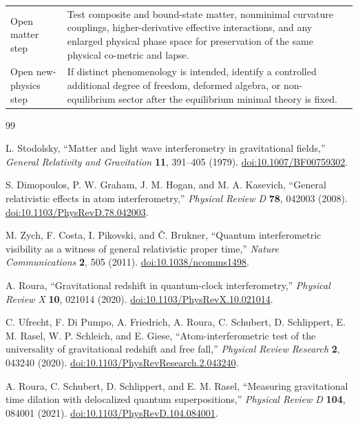 \documentclass[11pt]{article}
\begin{document}
\begin{longtable}{@{}p{}p{}@{}}
Open matter step & Test composite and bound-state matter, nonminimal curvature couplings, higher-derivative effective interactions, and any enlarged physical phase space for preservation of the same physical co-metric and lapse. \\
Open new-physics step & If distinct phenomenology is intended, identify a controlled additional degree of freedom, deformed algebra, or non-equilibrium sector after the equilibrium minimal theory is fixed. \\
\end{longtable}

\begin{thebibliography}{99}

L. Stodolsky,
``Matter and light wave interferometry in gravitational fields,''
\emph{General Relativity and Gravitation} \textbf{11}, 391--405 (1979).
\href{https://doi.org/10.1007/BF00759302}{doi:10.1007/BF00759302}.

S. Dimopoulos, P. W. Graham, J. M. Hogan, and M. A. Kasevich,
``General relativistic effects in atom interferometry,''
\emph{Physical Review D} \textbf{78}, 042003 (2008).
\href{https://doi.org/10.1103/PhysRevD.78.042003}{doi:10.1103/PhysRevD.78.042003}.

M. Zych, F. Costa, I. Pikovski, and \v{C}. Brukner,
``Quantum interferometric visibility as a witness of general relativistic proper time,''
\emph{Nature Communications} \textbf{2}, 505 (2011).
\href{https://doi.org/10.1038/ncomms1498}{doi:10.1038/ncomms1498}.

A. Roura,
``Gravitational redshift in quantum-clock interferometry,''
\emph{Physical Review X} \textbf{10}, 021014 (2020).
\href{https://doi.org/10.1103/PhysRevX.10.021014}{doi:10.1103/PhysRevX.10.021014}.

C. Ufrecht, F. Di Pumpo, A. Friedrich, A. Roura, C. Schubert, D. Schlippert,
E. M. Rasel, W. P. Schleich, and E. Giese,
``Atom-interferometric test of the universality of gravitational redshift and free fall,''
\emph{Physical Review Research} \textbf{2}, 043240 (2020).
\href{https://doi.org/10.1103/PhysRevResearch.2.043240}{doi:10.1103/PhysRevResearch.2.043240}.

A. Roura, C. Schubert, D. Schlippert, and E. M. Rasel,
``Measuring gravitational time dilation with delocalized quantum superpositions,''
\emph{Physical Review D} \textbf{104}, 084001 (2021).
\href{https://doi.org/10.1103/PhysRevD.104.084001}{doi:10.1103/PhysRevD.104.084001}.


\end{thebibliography}
\end{document}
